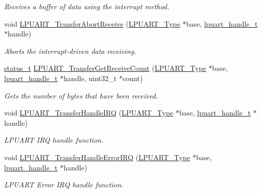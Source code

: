 \begin{DoxyCompactItemize}
\begin{DoxyCompactList}\small\item\em Receives a buffer of data using the interrupt method. \end{DoxyCompactList}\item 
void \mbox{\hyperlink{group__lpuart__driver_ga4950fa0f3835992251c109f655a3ca7d}{L\+P\+U\+A\+R\+T\+\_\+\+Transfer\+Abort\+Receive}} (\mbox{\hyperlink{struct_l_p_u_a_r_t___type}{L\+P\+U\+A\+R\+T\+\_\+\+Type}} $\ast$base, \mbox{\hyperlink{struct__lpuart__handle}{lpuart\+\_\+handle\+\_\+t}} $\ast$handle)
\begin{DoxyCompactList}\small\item\em Aborts the interrupt-\/driven data receiving. \end{DoxyCompactList}\item 
\mbox{\hyperlink{group__ksdk__common_gaaabdaf7ee58ca7269bd4bf24efcde092}{status\+\_\+t}} \mbox{\hyperlink{group__lpuart__driver_gabfcdc658c463e9e7523cc60c5e8f9672}{L\+P\+U\+A\+R\+T\+\_\+\+Transfer\+Get\+Receive\+Count}} (\mbox{\hyperlink{struct_l_p_u_a_r_t___type}{L\+P\+U\+A\+R\+T\+\_\+\+Type}} $\ast$base, \mbox{\hyperlink{struct__lpuart__handle}{lpuart\+\_\+handle\+\_\+t}} $\ast$handle, uint32\+\_\+t $\ast$count)
\begin{DoxyCompactList}\small\item\em Gets the number of bytes that have been received. \end{DoxyCompactList}\item 
void \mbox{\hyperlink{group__lpuart__driver_gac81ce3c490d7185ab7e2d97963ae077e}{L\+P\+U\+A\+R\+T\+\_\+\+Transfer\+Handle\+I\+RQ}} (\mbox{\hyperlink{struct_l_p_u_a_r_t___type}{L\+P\+U\+A\+R\+T\+\_\+\+Type}} $\ast$base, \mbox{\hyperlink{struct__lpuart__handle}{lpuart\+\_\+handle\+\_\+t}} $\ast$handle)
\begin{DoxyCompactList}\small\item\em L\+P\+U\+A\+RT I\+RQ handle function. \end{DoxyCompactList}\item 
void \mbox{\hyperlink{group__lpuart__driver_ga21345340b5d8f90df6bb64acab0f870f}{L\+P\+U\+A\+R\+T\+\_\+\+Transfer\+Handle\+Error\+I\+RQ}} (\mbox{\hyperlink{struct_l_p_u_a_r_t___type}{L\+P\+U\+A\+R\+T\+\_\+\+Type}} $\ast$base, \mbox{\hyperlink{struct__lpuart__handle}{lpuart\+\_\+handle\+\_\+t}} $\ast$handle)
\begin{DoxyCompactList}\small\item\em L\+P\+U\+A\+RT Error I\+RQ handle function. \end{DoxyCompactList}\end{DoxyCompactItemize}


